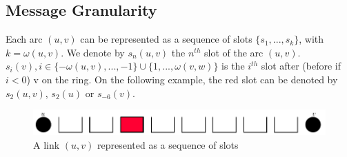 \documentclass[a4paper,10pt,french,english]{article}
\begin{document}
 \subsection{Message Granularity}
 Each arc $(u,v)$ can be represented as a sequence of slots $\{s_1, ... , s_k\}$, with $k = \omega(u,v)$. We denote by $s_n(u,v)$ the $n^{th}$ slot of the arc $(u,v)$. $s_i(v), i\in \{-\omega(u,v), ... , -1\} \cup \{1 , ... , \omega(v,w)\}$ is the $i^{th}$ slot after (before if $i<0$) v on the ring.
    On the following example, the red slot can be denoted by $s_2(u,v)$, $s_2(u)$ or $s_{-6}(v)$. 
    \begin{figure}[h]
    \centering
      \includegraphics[scale=0.5]{suv.pdf}

      \caption{A link $(u,v)$ represented as a sequence of slots}
  \end{figure}
  
\end{document}
